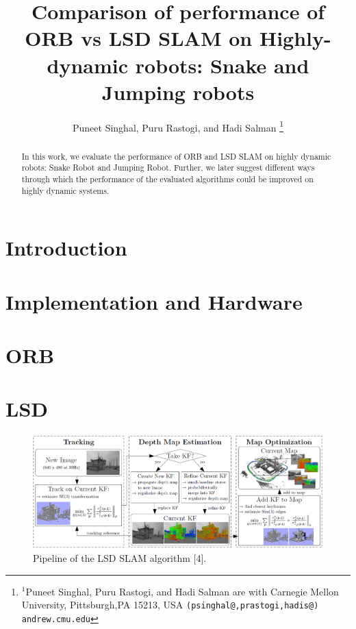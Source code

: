 \documentclass[letterpaper, 12 pt, conference]{ieeeconf}  %
\title{\LARGE \bf
Comparison of performance of ORB vs LSD SLAM on Highly-dynamic robots: Snake and Jumping robots
}
\author{Puneet Singhal, Puru Rastogi, and Hadi Salman%
\thanks{$^{1}$Puneet Singhal, Puru Rastogi, and Hadi Salman are with Carnegie Mellon University, Pittsburgh,PA 15213, USA
	{\tt\small (psinghal@,prastogi,hadis@) andrew.cmu.edu}}
}
\begin{document}
\maketitle
\thispagestyle{empty}
\pagestyle{empty}


\begin{abstract}

In this work, we evaluate the performance of ORB and LSD SLAM on highly dynamic robots: Snake Robot and Jumping Robot. Further, we later suggest different ways through which the performance of the evaluated algorithms could be improved on highly dynamic systems.

\end{abstract}


\section{Introduction}




\section{Implementation and Hardware}
\label{sec:Hardware}


\section{ORB}
\label{sec:ORB}


\section{LSD}
\label{sec:LSD}



\begin{figure}
	\centering
	\includegraphics[width=1.0\linewidth]{figures/LSD_summary}
	\caption{Pipeline of the LSD SLAM algorithm [4].}
	\label{fig:lsdsummary}
\end{figure}
\end{document}
